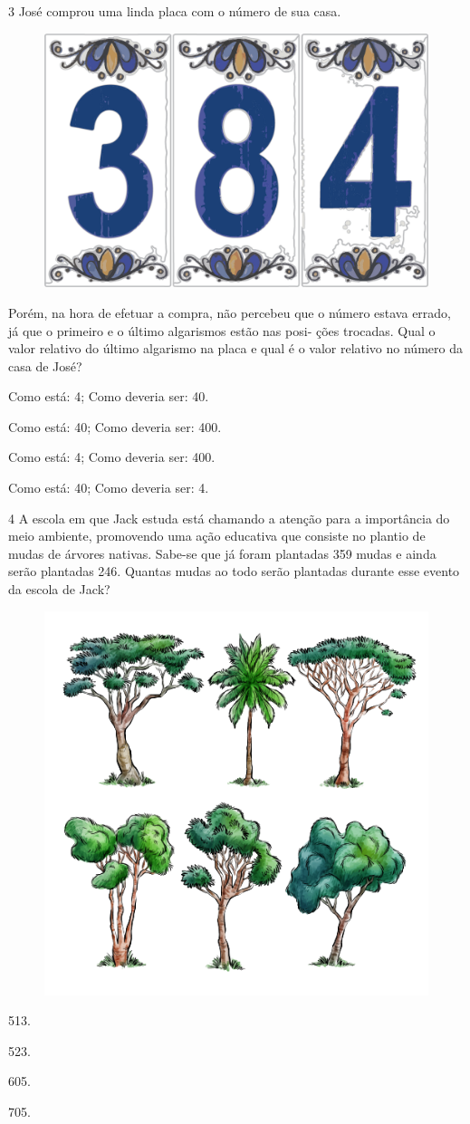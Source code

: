 \pagebreak
\num{3} José comprou uma linda placa com o número de sua casa.

\begin{figure}[htpb!]
\centering
\includegraphics[width=.2\textwidth]{./media/image92.png}
\end{figure}


Porém, na hora de efetuar a compra, não percebeu que o número
estava errado, já que o primeiro e o último algarismos estão nas posi-
ções trocadas. Qual o valor relativo do último algarismo na placa e qual é o valor relativo no número da casa de José?

\begin{escolha}
\item
  Como está: 4; Como deveria ser: 40.
\item
  Como está: 40; Como deveria ser: 400.
\item
  Como está: 4; Como deveria ser: 400.
\item
  Como está: 40; Como deveria ser: 4.
\end{escolha}


\num{4} A escola em que Jack estuda está chamando a atenção para a importância do meio ambiente, promovendo uma ação educativa que consiste no plantio de mudas de árvores
nativas. Sabe-se que já foram plantadas 359 mudas e ainda serão
plantadas 246. Quantas mudas ao todo serão plantadas durante esse evento
da escola de Jack?

\begin{figure}[htpb!]
\centering
\includegraphics[width=.3\textwidth]{./media/image92a.png}
\end{figure}

\begin{escolha}
\begin{multicols}{2}
\item
  513.
\item
  523.
\item
  605.
\item
  705.
\end{multicols}
\end{escolha}

